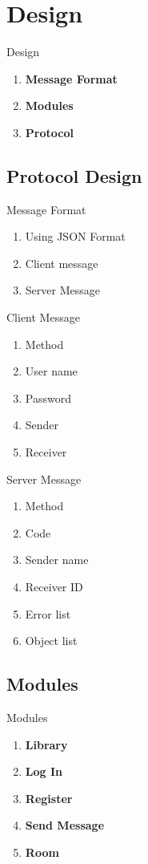 \documentclass{beamer}
\begin{document}
\section{Design}
\begin{frame}{Design}
\begin{enumerate}
\item \textbf{Message Format}
\item \textbf{Modules}
\item \textbf{Protocol}
\end{enumerate}
\end{frame}


\subsection{Protocol Design}
\begin{frame}{Message Format}
\begin{enumerate}
\item Using JSON Format
\item Client message
\item Server Message
\end{enumerate}
\end{frame}


\begin{frame}{Client Message}
\begin{enumerate}
\item Method 
\item User name
\item Password
\item Sender
\item Receiver
\end{enumerate}

\end{frame}

\begin{frame}{Server Message}
\begin{enumerate}
\item Method
\item Code
\item Sender name
\item Receiver ID
\item Error list
\item Object list
\end{enumerate}

\end{frame}

\subsection{Modules}
\begin{frame}{Modules}
\begin{enumerate}
\item \textbf{Library}
\item \textbf{Log In}
\item \textbf{Register}
\item \textbf{Send Message}
\item \textbf{Room}
\end{enumerate}
\end{frame}
\end{document}
